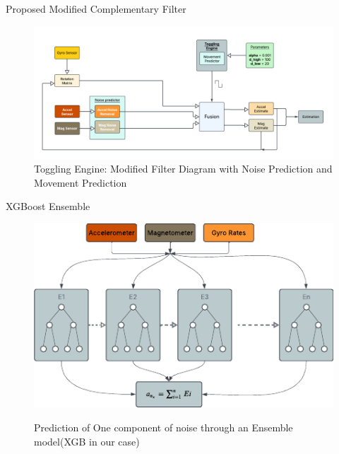 \documentclass[aspectratio=169,xcolor=dvipsnames]{beamer}
\begin{document}
\begin{frame}{Proposed Modified Complementary Filter}
\begin{figure}
    \centering
    \includegraphics[width=1\linewidth]{logos/workflownew.png}
    \caption{Toggling Engine: Modified Filter Diagram with Noise Prediction and Movement Prediction}
    \label{fig:twinboost}
\end{figure}
\end{frame}

\begin{frame}{XGBoost Ensemble}
\begin{figure}
    \centering
    \includegraphics[width=0.6\linewidth]{logos/ensemble.png}
    \label{fig:twinboost}
    \caption{Prediction of One component of noise through an Ensemble model(XGB in our case)}
\end{figure}
\end{frame}
\end{document}

